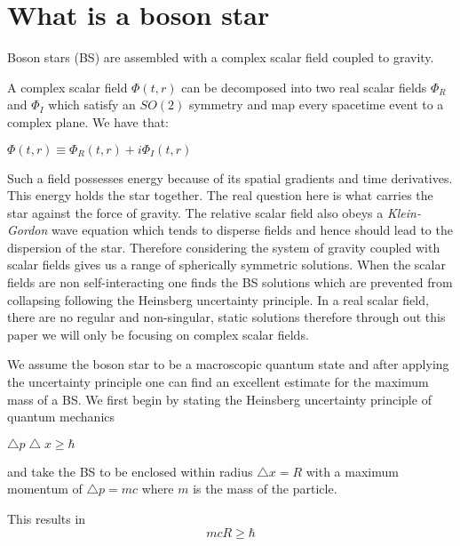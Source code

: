\documentclass[12pt]{article}
\numberwithin{equation}{section}
\numberwithin{theorem}{subsection}
\begin{document}
\section{What is a boson star}

Boson stars (BS) are assembled with a complex scalar field coupled to gravity.

A complex scalar field $\Phi(t,r)$ can be decomposed into two real scalar fields $\Phi_{R}$ and $\Phi_{I}$ which satisfy an $SO(2)$ symmetry and map every spacetime event to a complex plane. We have that:

\begin{center}

    $\Phi(t,r) \equiv \Phi_{R}(t,r)+i\Phi_{I}(t,r)$

\end{center}

Such a field possesses energy because of its spatial gradients and time derivatives. This energy holds the star together. The real question here is what carries the star against the force of gravity. The relative scalar field also obeys a \textit{Klein-Gordon} wave equation which tends to disperse fields and hence should lead to the dispersion of the star. Therefore considering the system of gravity coupled with scalar fields gives us a range of spherically symmetric solutions. When the scalar fields are non self-interacting one finds the BS solutions which are prevented from collapsing following the Heinsberg uncertainty principle. In a real scalar field, there are no regular and non-singular, static solutions therefore through out this paper we will only be focusing on complex scalar fields. 

\newline

We assume the boson star to be a macroscopic quantum state and after applying the uncertainty principle one can find an excellent estimate for the maximum mass of a BS. We first begin by stating the Heinsberg uncertainty principle of quantum mechanics \begin{center}

 $\bigtriangleup p \bigtriangleup x \geq \hbar$ 

\end{center}and take the BS to be enclosed within radius $\bigtriangleup x = R$ with a maximum momentum of $\bigtriangleup p = mc$ where $m$ is the mass of the particle.

This results in \begin{equation}

    mc R \geq \hbar

    \end{equation}
\end{document}
